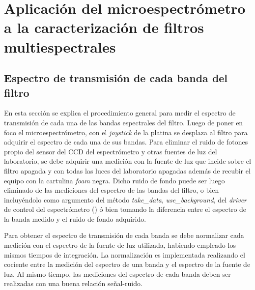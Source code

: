 \singlespacing
\section{Aplicación del microespectrómetro a la caracterización de filtros multiespectrales}
\label{sec:resgrales}


\singlespacing
\subsection{Espectro de transmisión de cada banda del filtro \href{https://github.com/jrr1984/open_frame_XYStage/blob/master/plot_spectrum_bands/plot_spectrum_bands.py}{\faGithub}}
\label{sec:espectransm}

\hspace{0.5cm}En esta sección se explica el procedimiento general para medir el espectro de transmisión de cada una de las bandas espectrales del filtro. Luego de poner en foco el microespectrómetro, con el \textit{joystick} de la platina se desplaza al filtro para adquirir el espectro de cada una de sus bandas. Para eliminar el ruido de fotones propio del sensor del CCD del espectrómetro y otras fuentes de luz del laboratorio, se debe adquirir una medición con la fuente de luz que incide sobre el filtro apagada y con todas las luces del laboratorio apagadas además de recubir el equipo con la cartulina \textit{foam} negra. Dicho ruido de fondo puede ser luego eliminado de las mediciones del espectro de las bandas del filtro, o bien incluyéndolo como argumento del método \textit{take\_data}, \textit{use\_background}, del \textit{driver} de control del espectrómetro (\href{https://github.com/jrr1984/open\_frame\_XYStage/blob/master/XYStageAndSpec.py}{\faGithub}) ó bien tomando la diferencia entre el espectro de la banda medido y el ruido de fondo adquirido.

Para obtener el espectro de transmisión de cada banda se debe normalizar cada medición con el espectro de la fuente de luz utilizada, habiendo empleado los mismos tiempos de integración. La normalización es implementada realizando el cociente entre la medición del espectro de una banda y el espectro de la fuente de luz. Al mismo tiempo, las mediciones del espectro de cada banda deben ser realizadas con una buena relación señal-ruido.

